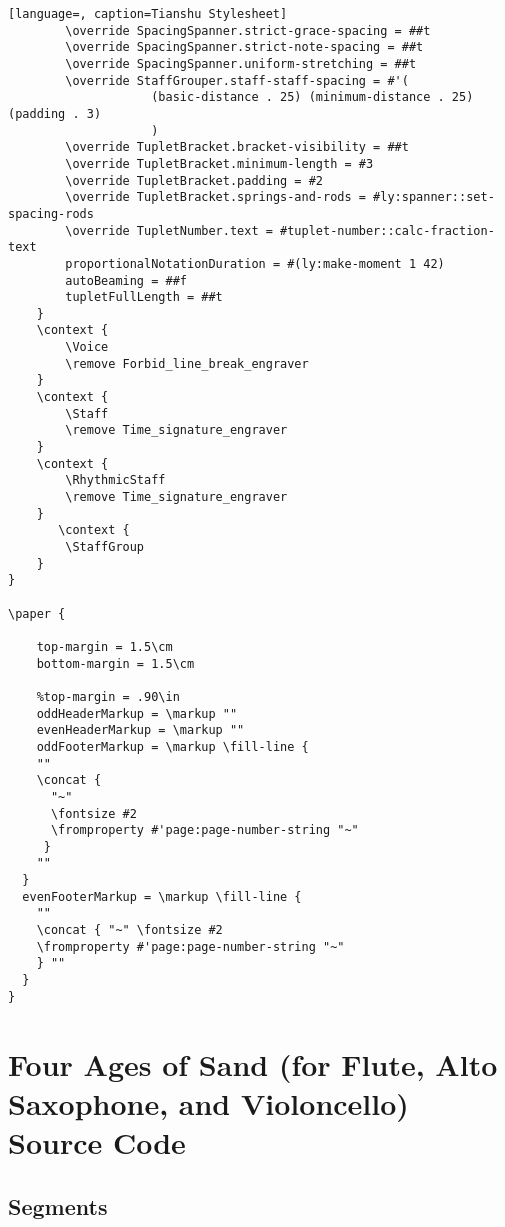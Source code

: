 \begin{lstlisting}[language=, caption=Tianshu Stylesheet]
        \override SpacingSpanner.strict-grace-spacing = ##t
        \override SpacingSpanner.strict-note-spacing = ##t
        \override SpacingSpanner.uniform-stretching = ##t
        \override StaffGrouper.staff-staff-spacing = #'(
					(basic-distance . 25) (minimum-distance . 25) (padding . 3)
					)
        \override TupletBracket.bracket-visibility = ##t
        \override TupletBracket.minimum-length = #3
        \override TupletBracket.padding = #2
        \override TupletBracket.springs-and-rods = #ly:spanner::set-spacing-rods
        \override TupletNumber.text = #tuplet-number::calc-fraction-text
		proportionalNotationDuration = #(ly:make-moment 1 42)
        autoBeaming = ##f
        tupletFullLength = ##t
    }
	\context {
        \Voice
        \remove Forbid_line_break_engraver
    }
    \context {
        \Staff
        \remove Time_signature_engraver
    }
    \context {
        \RhythmicStaff
        \remove Time_signature_engraver
    }
       \context {
        \StaffGroup
    }
}

\paper {

	top-margin = 1.5\cm
	bottom-margin = 1.5\cm

	%top-margin = .90\in
	oddHeaderMarkup = \markup ""
	evenHeaderMarkup = \markup ""
	oddFooterMarkup = \markup \fill-line {
    ""
    \concat {
      "~"
	  \fontsize #2
	  \fromproperty #'page:page-number-string "~"
     }
    ""
  }
  evenFooterMarkup = \markup \fill-line {
    ""
	\concat { "~" \fontsize #2
	\fromproperty #'page:page-number-string "~"
    } ""
  }
}
\end{lstlisting}
\doublespace

\section{Four Ages of Sand (for Flute, Alto Saxophone, and Violoncello) Source Code}
\subsection{Segments}
